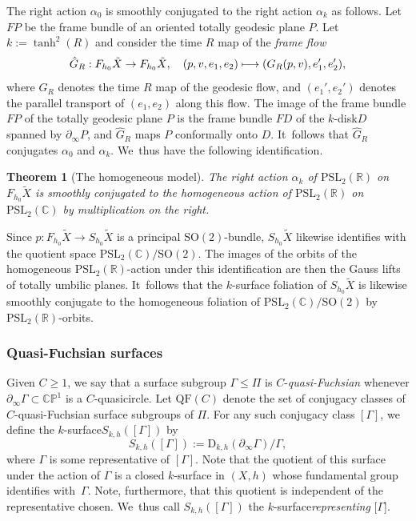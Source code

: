 \documentclass[JEP,XML,SOM,Unicode,NoEqCountersInSection,published]{cedram}
\newcommand\mto{\mathchoice{\longmapsto}{\mapsto}{\mapsto}{\mapsto}}
\newcommand{\ksurface}{$k$\nobreakdash-surface\xspace}
\newcommand{\kdisk}{$k$\nobreakdash-disk\xspace}
\theoremstyle{plain}
\newtheorem{theorem}{Theorem}[section]
\theoremstyle{definition}
\newcommand\PSL{\mathrm{PSL}_2(\mathbb{R})}
\newcommand\PSLc{\mathrm{PSL}_2(\mathbb{C})}
\newcommand{\C}{{\mathbb C}}
\newcommand{\PP}{{\mathbb P}}
\let\dans\subset
\newcommand{\QF}{\mathrm{QF}}
\newcommand{\rD}{\mathrm{D}}
\newcommand{\bord}{\partial_{\infty}}
\begin{document}
The right action $\alpha_0$ is smoothly conjugated to the right action $\alpha_k$ as follows. Let $FP$ be the frame bundle of an oriented totally geodesic plane $P$. Let $k:=\tanh^2(R)$ and consider the time $R$ map of the \emph{frame flow}
\[
\hat G_R:F_{h_0}\tilde X\to F_{h_0}\tilde X,\quad(p,v,e_1,e_2)\mto(G_R(p,v),e_1',e_2'),
\]
where $G_R$ denotes the time $R$ map of the geodesic flow, and $(e_1',e_2')$ denotes the parallel transport of $(e_1,e_2)$ along this flow. The image of the frame bundle $FP$ of the totally geodesic plane $P$ is the frame bundle $FD$ of the \kdisk $D$ spanned by $\bord P$, and $\hat G_R$ maps $P$ conformally onto $D$. It~follows that $\hat G_R$ conjugates $\alpha_0$ and $\alpha_k$. We~thus have the following identification.

\begin{theorem}[The homogeneous model]\label{t.homogeneous_model}
The right action $\alpha_k$ of $\PSL$ on $F_{h_0}\tilde{X}$ is smoothly conjugated to the homogeneous action of $\PSL$ on $\PSLc$ by multiplication on the right.
\end{theorem}

Since $p:F_{h_0}\tilde{X}\to S_{h_0}\tilde{X}$ is a principal $\text{SO}(2)$-bundle, $S_{h_0}\tilde{X}$ likewise identifies with the quotient space $\PSLc/\text{SO}(2)$. The images of the orbits of the homogeneous $\PSL$-action under this identification are then the Gauss lifts of totally umbilic planes. It~follows that the \ksurface foliation of $S_{h_0}\tilde{X}$ is likewise smoothly conjugate to the homogeneous foliation of $\PSLc/\text{SO}(2)$ by $\PSL$-orbits.


\subsubsection{Quasi-Fuchsian surfaces} Given $C\geq 1$, we say that a surface subgroup \hbox{$\Gamma\leq\Pi$} is $C$-\emph{quasi-Fuchsian} whenever $\partial_\infty\Gamma\dans\C\PP^1$ is a $C$-quasicircle. Let $\QF(C)$ denote the set of conjugacy classes of $C$-quasi-Fuchsian surface subgroups of $\Pi$. For any such conjugacy class $[\Gamma]$, we define the \ksurface $S_{k,h}([\Gamma])$ by
\begin{equation}\label{eq.rep_surface}
S_{k,h}([\Gamma]):=\rD_{k,h}(\partial_\infty\Gamma)/\Gamma,
\end{equation}
where $\Gamma$ is some representative of $[\Gamma]$. Note that the quotient of this surface under the action of $\Gamma$ is a closed \ksurface in $(X,h)$ whose fundamental group identifies with~$\Gamma$. Note, furthermore, that this quotient is independent of the representative chosen. We~thus call $S_{k,h}([\Gamma])$ the \ksurface \emph{representing} $[\Gamma$].
\end{document}
